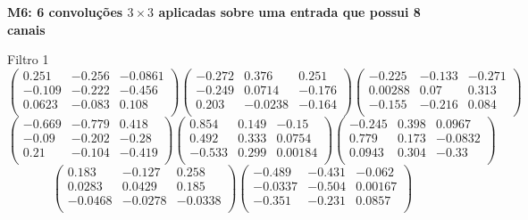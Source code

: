\textbf{M6: 6 convoluções $3 \times 3$ aplicadas sobre uma entrada que 
possui 8 canais}

Filtro 1
{ \small
\[
\begin{pmatrix}
  0.251 & -0.256 & -0.0861 \\
  -0.109 & -0.222 & -0.456 \\
  0.0623 & -0.083 & 0.108 \\
\end{pmatrix}
\begin{pmatrix}
  -0.272 & 0.376 & 0.251 \\
  -0.249 & 0.0714 & -0.176 \\
  0.203 & -0.0238 & -0.164 \\
\end{pmatrix}
\begin{pmatrix}
  -0.225 & -0.133 & -0.271 \\
  0.00288 & 0.07 & 0.313 \\
  -0.155 & -0.216 & 0.084 \\
\end{pmatrix}
\]
\[
\begin{pmatrix}
  -0.669 & -0.779 & 0.418 \\
  -0.09 & -0.202 & -0.28 \\
  0.21 & -0.104 & -0.419 \\
\end{pmatrix}
\begin{pmatrix}
  0.854 & 0.149 & -0.15 \\
  0.492 & 0.333 & 0.0754 \\
  -0.533 & 0.299 & 0.00184 \\
\end{pmatrix}
\begin{pmatrix}
  -0.245 & 0.398 & 0.0967 \\
  0.779 & 0.173 & -0.0832 \\
  0.0943 & 0.304 & -0.33 \\
\end{pmatrix}
\]
\[
\begin{pmatrix}
  0.183 & -0.127 & 0.258 \\
  0.0283 & 0.0429 & 0.185 \\
  -0.0468 & -0.0278 & -0.0338 \\
\end{pmatrix}
\begin{pmatrix}
  -0.489 & -0.431 & -0.062 \\
  -0.0337 & -0.504 & 0.00167 \\
  -0.351 & -0.231 & 0.0857 \\
\end{pmatrix}
\]
}

